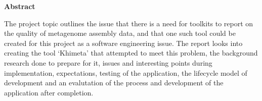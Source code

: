 \thispagestyle{empty}

\begin{center}
    {\LARGE\bf Abstract}
\end{center}

The project topic outlines the issue that there is a need for toolkits to report on the quality of metagenome assembly data, and that one such tool could be created for this project as a software engineering issue. The report looks into creating the tool `Khimeta' that attempted to meet this problem, the background research done to prepare for it, issues and interesting points during implementation, expectations, testing of the application, the lifecycle model of development and an evalutation of the process and development of the application after completion.

